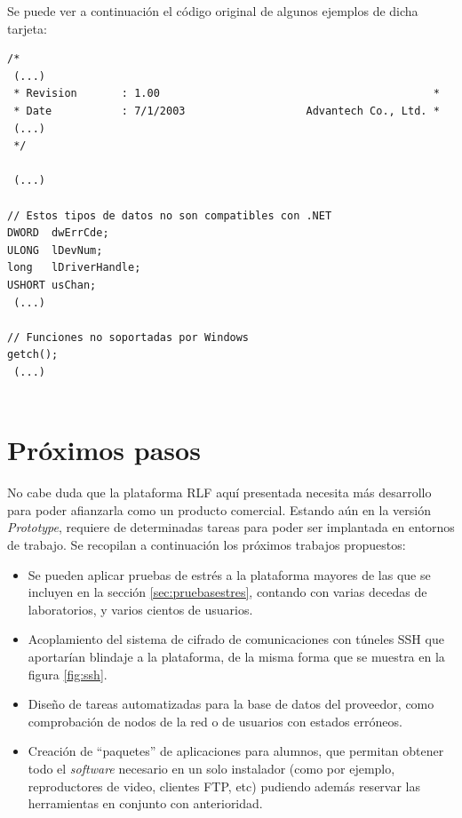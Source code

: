 Se puede ver a continuación el código original de algunos ejemplos de 
dicha tarjeta:

\begin{verbatim}
/*
 (...)
 * Revision       : 1.00                                           *
 * Date           : 7/1/2003                   Advantech Co., Ltd. *
 (...)
 */
 
 (...)
 
// Estos tipos de datos no son compatibles con .NET
DWORD  dwErrCde;
ULONG  lDevNum;
long   lDriverHandle;
USHORT usChan;
 (...)
 
// Funciones no soportadas por Windows
getch();
 (...)


\end{verbatim}

\clearpage

\section{Próximos pasos}
No cabe duda que la plataforma RLF aquí presentada necesita más 
desarrollo para poder afianzarla como un producto comercial. Estando 
aún en la versión \emph{Prototype}, requiere de determinadas tareas 
para poder ser implantada en entornos de trabajo. Se recopilan a 
continuación los próximos trabajos propuestos:

\begin{itemize}
\item Se pueden aplicar pruebas de estrés a la plataforma mayores de 
las que se incluyen en la sección \ref{sec:pruebasestres}, contando 
con varias decedas de laboratorios, y varios cientos de usuarios.
\item Acoplamiento del sistema de cifrado de comunicaciones con 
túneles SSH que aportarían blindaje a la plataforma, de la misma 
forma que se muestra en la figura \ref{fig:ssh}.
\item Diseño de tareas automatizadas para la base de datos del 
proveedor, como comprobación de nodos de la red o de usuarios con 
estados erróneos.
\item Creación de ``paquetes'' de aplicaciones para alumnos, que 
permitan obtener todo el \emph{software} necesario en un solo 
instalador (como por ejemplo, reproductores de video, clientes FTP, 
etc) pudiendo además reservar las herramientas en conjunto con 
anterioridad.
\end{itemize}

